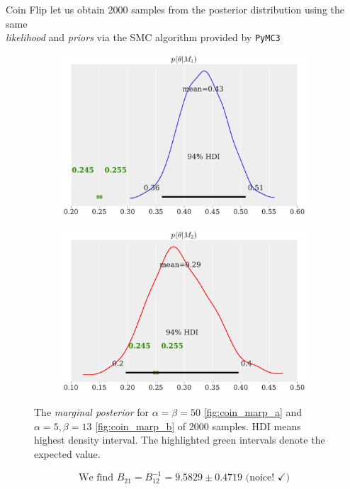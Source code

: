 \documentclass[11pt,aspectratio=1610,dvipsnames]{beamer}
\begin{document}
\begin{frame}{Coin Flip}
	let us obtain 2000 samples from the posterior distribution using the same \\ \emph{likelihood} and \emph{priors} via the SMC algorithm provided by \texttt{PyMC3}
	\begin{figure}[htbp]
		\begin{subfigure}{.49\linewidth}
			\includegraphics[width=0.9\linewidth]{coin_marp_m1.pdf}
			\subcaption{}\label{fig:coin_marp_a}
		\end{subfigure}
		\begin{subfigure}{.49\linewidth}
			\includegraphics[width=0.9\linewidth]{coin_marp_m2.pdf}
			\subcaption{}\label{fig:coin_marp_b}
		\end{subfigure}
		\caption{The \emph{marginal posterior} for $\alpha=\beta=50$ \eqref{fig:coin_marp_a} and $\alpha=5, \beta=13$ \eqref{fig:coin_marp_b} of 2000 samples. HDI means highest density interval. The highlighted green intervals denote the expected value.}\label{fig:coin_marp}
	\end{figure}
 $$\text{We find }B_{21}=B_{12}^{-1}=9.5829\pm0.4719  \text{ (noice! } \checkmark)$$
\end{frame}
\end{document}
